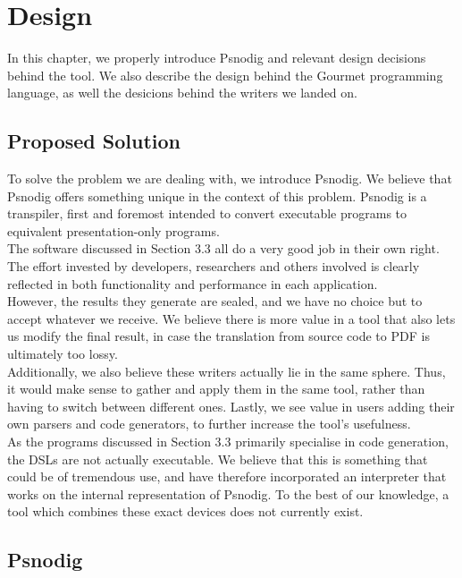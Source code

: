 \chapter{Design}

In this chapter, we properly introduce Psnodig and relevant design decisions behind the tool. We also describe the design behind the Gourmet programming language, as well the desicions behind the writers we landed on.

\section{Proposed Solution}

To solve the problem we are dealing with, we introduce Psnodig. We believe that Psnodig offers something unique in the context of this problem. Psnodig is a transpiler, first and foremost intended to convert executable programs to equivalent presentation-only programs. \\

The software discussed in Section 3.3 all do a very good job in their own right. The effort invested by developers, researchers and others involved is clearly reflected in both functionality and performance in each application. \\

However, the results they generate are sealed, and we have no choice but to accept whatever we receive. We believe there is more value in a tool that also lets us modify the final result, in case the translation from source code to PDF is ultimately too lossy. \\

Additionally, we also believe these writers actually lie in the same sphere. Thus, it would make sense to gather and apply them in the same tool, rather than having to switch between different ones. Lastly, we see value in users adding their own parsers and code generators, to further increase the tool's usefulness. \\

As the programs discussed in Section 3.3 primarily specialise in code generation, the DSLs are not actually executable. We believe that this is something that could be of tremendous use, and have therefore incorporated an interpreter that works on the internal representation of Psnodig. To the best of our knowledge, a tool which combines these exact devices does not currently exist.

\section{Psnodig}


